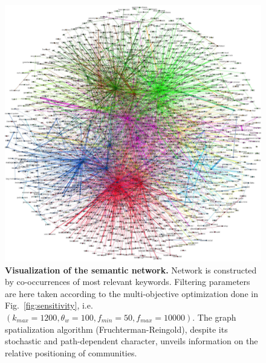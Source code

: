 \documentclass[10pt]{article}
\begin{document}
\begin{figure}
\includegraphics[width=\linewidth]{Fig7.jpg}
\caption{\textbf{Visualization of the semantic network.} Network is constructed by co-occurrences of most relevant keywords. Filtering parameters are here taken according to the multi-objective optimization done in Fig.~\ref{fig:sensitivity}, i.e. $(k_{max}=1200,\theta_w=100,f_{min}=50,f_{max}=10000)$. The graph spatialization algorithm (Fruchterman-Reingold), despite its stochastic and path-dependent character, unveils information on the relative positioning of communities.}
\label{fig:semanticnw}
\end{figure}
\end{document}
